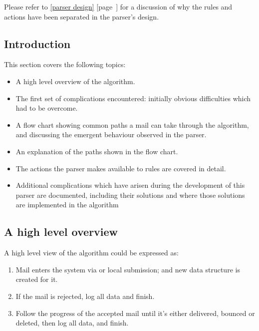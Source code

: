 \documentclass[a4paper,12pt,draft]{article}
\newcommand{\refwithpage}[1]{%
    \empty{}\ref{#1} [page~\pageref{#1}]%
}
\newcommand{\sectionref}[1]{%
    \textsection{}\refwithpage{#1}%
}
\begin{document}
Please refer to \sectionref{parser design} for a discussion of why the
rules and actions have been separated in the parser's design.

\subsection{Introduction}

This section covers the following topics:

\begin{itemize}

    \item A high level overview of the algorithm.

    \item The first set of complications encountered: initially obvious
        difficulties which had to be overcome.

    \item A flow chart showing common paths a mail can take through the
        algorithm, and discussing the emergent behaviour observed in the
        parser.

    \item An explanation of the paths shown in the flow chart.

    \item The actions the parser makes available to rules are covered in
        detail.

    \item Additional complications which have arisen during the development
        of this parser are documented, including their solutions and where
        those solutions are implemented in the algorithm

\end{itemize}

\subsection{A high level overview}

A high level view of the algorithm could be expressed as:

\begin{enumerate}

    \item Mail enters the system via \SMTP{} or local submission; and new
        data structure is created for it.

    \item If the mail is rejected, log all data and finish.

    \item Follow the progress of the accepted mail until it's either
        delivered, bounced or deleted, then log all data, and finish.

\end{enumerate}
\end{document}
